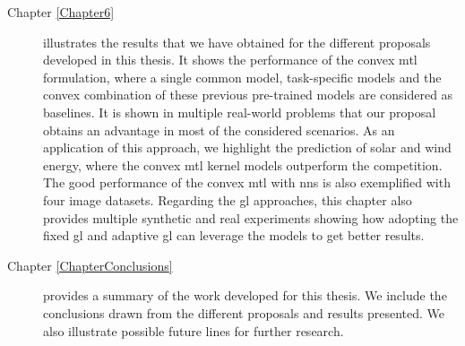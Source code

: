 \begin{description}
\item [{ Chapter \ref{Chapter6}}] illustrates the results that we have obtained for the different proposals developed in this thesis. It shows the performance of the convex \acrshort{mtl} formulation, where a single common model, task-specific models and the convex combination of these previous pre-trained models are considered as baselines. It is shown in multiple real-world problems that our proposal obtains an advantage in most of the considered scenarios. As an application of this approach, we highlight the prediction of solar and wind energy, where the convex \acrshort{mtl} kernel models outperform the competition. The good performance of the convex \acrshort{mtl} with \acrshort{nns} is also exemplified with four image datasets. Regarding the \acrshort{gl} approaches, this chapter also provides multiple synthetic and real experiments showing how adopting the fixed \acrshort{gl} and adaptive \acrshort{gl} can leverage the models to get better results.



\item [{Chapter \ref{ChapterConclusions}}] provides a summary of the work developed for this thesis. We include the conclusions drawn from the different proposals and results presented. We also illustrate possible future lines for further research.

\end{description}


